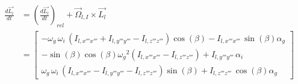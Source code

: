\begin{align*}
\frac{d\overrightarrow{L_{l}}}{dt}&=\left(\frac{d\overrightarrow{L_{l}}}{dt}\right)_{rel}+\overrightarrow{\Omega}_{l,I}\times  \overrightarrow{L_{l}}\\
&=\begin{bmatrix}
-\omega_{g}\,\omega_{i}\, \left( {I_{l,x'''x'''}}+{I_{l,y'''y'''}}-{I_{l,z'''z'''}} \right) \cos \left( \beta
 \right) -{I_{l,x'''x'''}}\,\sin \left( \beta \right) \alpha_{g}
\\ 
-\sin \left( \beta \right) \cos \left( \beta
 \right) {\omega_{g}}^{2} \left( {I_{l,x'''x'''}}-{I_{l,z'''z'''}}
 \right) +{I_{l,y'''y'''}}\,\alpha_{i}\\ 
 \omega_{g}\,
\omega_{i}\, \left( {I_{l,x'''x'''}}-{I_{l,y'''y'''}}-{I_{l,z'''z'''}}
 \right) \sin \left( \beta \right) +{I_{l,z'''z'''}}\,\cos \left( \beta
 \right) \alpha_{g}\
\end{bmatrix}
\end{align*}

